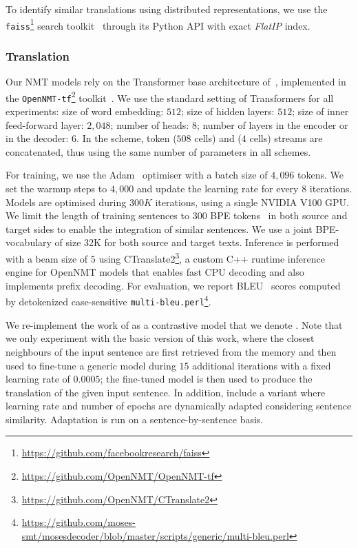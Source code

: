 To identify similar translations using distributed representations, we use the \texttt{faiss}\footnote{\url{https://github.com/facebookresearch/faiss}} search toolkit~\citep{Johnson19billion} through its Python API with exact \textit{FlatIP} index. 

\subsubsection*{Translation}

Our NMT models rely on the Transformer base architecture of~\citet{Vaswani17attention}, implemented in the \texttt{OpenNMT-tf}\footnote{\url{https://github.com/OpenNMT/OpenNMT-tf}} toolkit~\citep{Klein17opennmt}.
%
We use the standard setting of Transformers for all experiments: size of word embedding: $512$; size of hidden layers: $512$; size of inner feed-forward layer: $2,048$; number of heads: $8$; number of layers in the encoder or in the decoder: $6$. In the  scheme, 
token ($508$ cells) and  ($4$ cells) streams are concatenated, thus using the same number of parameters in all schemes.

For training, we use the Adam~\citep{Kingma15adam} optimiser with a batch size of $4,096$ tokens. We set the warmup steps to $4,000$ and update the learning rate for every $8$ iterations. Models are optimised during $300K$ iterations, using a single NVIDIA V100 GPU.
%
We limit the length of training sentences to $300$ BPE tokens~\citep{Sennrich16neural} in both source and target sides to enable the integration of similar sentences. We use a joint BPE-vocabulary of size 32K for both source and target texts. Inference is performed with a beam size of $5$ using CTranslate2\footnote{\url{https://github.com/OpenNMT/CTranslate2}}, a custom C++ runtime inference engine for OpenNMT models that enables fast CPU decoding and also implements prefix decoding.
For evaluation, we report BLEU~\citep{Papineni02bleu} scores computed by detokenized case-sensitive \texttt{multi-bleu.perl}\footnote{\url{https://github.com/moses-smt/mosesdecoder/blob/master/scripts/generic/multi-bleu.perl}}.

We re-implement the work of \citet{Farajian17multidomain} as a contrastive model that we denote . Note that we only experiment with the basic version of this work, where the closest neighbours of the input sentence are first retrieved from the memory and then used to fine-tune a generic model during $15$ additional iterations with a fixed learning rate of $0.0005$; the fine-tuned model is then used to produce the translation of the given input sentence. In addition, \citet{Farajian17multidomain} include a variant where learning rate and number of epochs are dynamically adapted considering sentence similarity.
Adaptation is run on a sentence-by-sentence basis.


